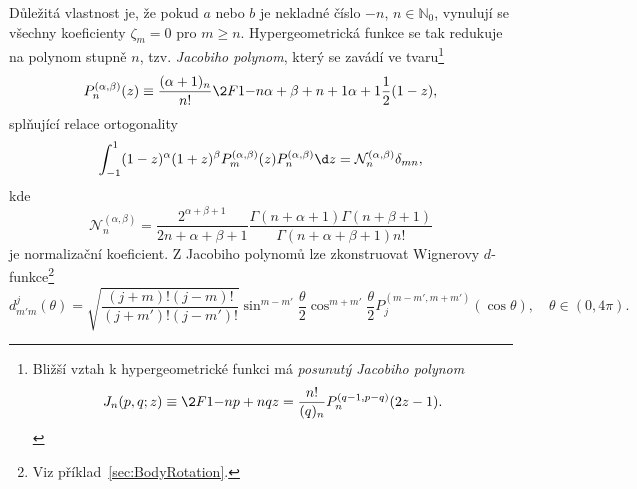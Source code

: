 Důležitá vlastnost je, že pokud $a$ nebo $b$ je nekladné číslo $-n$, $n\in\mathbb{N}_{0}$,
vynulují se všechny koeficienty $\zeta_{m}=0$ pro $m\geq n$.
Hypergeometrická funkce se tak redukuje na polynom stupně $n$, tzv. \emph{Jacobiho polynom},
který se zavádí ve tvaru\footnote{
    Bližší vztah k hypergeometrické funkci má \emph{posunutý Jacobiho polynom}
    \begin{equation}
        J_{n}(p,q;z)
            \equiv\2F1{-n}{p+n}{q}{z}
            =\frac{n!}{(q)_n}P_{n}^{(q-1,p-q)}(2z-1).
    \end{equation}
    }
\begin{equation}
    P^{(\alpha,\beta)}_{n}(z)
        \equiv\frac{(\alpha+1)_{n}}{n!}\2F1{-n}{\alpha+\beta+n+1}{\alpha+1}{\frac{1}{2}(1-z)},
\end{equation}
splňující relace ortogonality
\begin{equation}
    \int_{-1}^{1}(1-z)^{\alpha}(1+z)^{\beta}P_{m}^{(\alpha,\beta)}(z)
        P_{n}^{(\alpha,\beta)}\d z
        =\mathcal{N}_{n}^{(\alpha,\beta)}\delta_{mn},
\end{equation}
kde
\begin{equation}
    \mathcal{N}_{n}^{(\alpha,\beta)}
        =\frac{2^{\alpha+\beta+1}}{2n+\alpha+\beta+1}\frac{\Gamma(n+\alpha+1)\Gamma(n+\beta+1)}{\Gamma(n+\alpha+\beta+1)n!}
\end{equation}
je normalizační koeficient. 
Z Jacobiho polynomů lze zkonstruovat Wignerovy $d$-funkce\footnote{
    Viz příklad~\ref{sec:BodyRotation}.
}
\begin{equation}
    d_{m'm}^{j}(\theta)
        =\sqrt{\frac{(j+m)!(j-m)!}{(j+m')!(j-m')!}}
        \sin^{m-m'}\frac{\theta}{2}\cos^{m+m'}\frac{\theta}{2}
        P_{j}^{(m-m',m+m')}(\cos\theta),\quad\theta\in(0,4\pi).
\end{equation}

